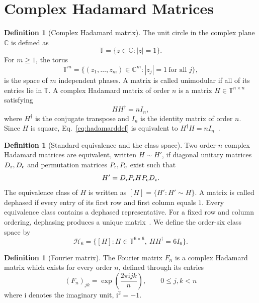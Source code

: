 \documentclass[aps,prx,reprint,nofootinbib,twoside,superscriptaddress,longbibliography,floatfix]{revtex4-2}
\theoremstyle{definition}
\newtheorem{definition}[theorem]{Definition}
\newcommand{\T}{\mathbb T}
\newcommand{\C}{\mathbb C}
\newcommand{\I}{\mathrm i}
\newcommand{\HH}{\mathcal H}
\begin{document}
\section{Complex Hadamard Matrices}
\label{sec:definition_hadamard}
\begin{definition}[Complex Hadamard matrix]
\label{def:hadamard}
The unit circle in the complex plane $\C$ is defined as
\begin{equation}
\T=\{z\in\C:|z|=1\}.
\label{eq:unitcircle}
\end{equation}
For $m\geq1$, the torus
\begin{equation}
    \T^m=\{(z_1,\ldots,z_m)\in\C^m:|z_j|=1\ \text{for all }j\},
\end{equation}
is the space of $m$ independent phases. 
A matrix is called unimodular if all of its entries lie in $\T$.
A complex Hadamard matrix of order $n$ is a matrix
$H\in\T^{n\times n}$ satisfying
\begin{equation}
HH^{\dagger}=nI_n,
\label{eq:hadamarddef}
\end{equation}
where $H^{\dagger}$ is the conjugate transpose and $I_n$ is the identity matrix of order $n$. Since $H$ is square, Eq.~\eqref{eq:hadamarddef} is equivalent to
$H^{\dagger}H=nI_n$~\cite{TadejZyczkowski2006}.
\end{definition}

\begin{definition}[Standard equivalence and the class space]
\label{def:equivalence}
Two order-$n$ complex Hadamard matrices are equivalent, written $H\sim H'$, if diagonal unitary matrices $D_{\rm r},D_{\rm c}$ and permutation matrices $P_{\rm r},P_{\rm c}$ exist such that
\begin{equation}
H'=D_{\rm r}P_{\rm r}HP_{\rm c}D_{\rm c}.
\label{eq:equivalence}
\end{equation}
The equivalence class of $H$ is written as $[H]=\{H':H'\sim H\}$. 
A matrix is called dephased if every entry of its first row and first column equals $1$. Every equivalence class contains a dephased representative. 
For a fixed row and column ordering, dephasing produces a unique matrix~\cite{TadejZyczkowski2006,Szollosi2012FourParameter}.
We define the order-six class space by
\begin{equation}
\HH_6 =\bigl\{[H]:H\in\T^{6\times6},\ HH^{\dagger}=6I_6\bigr\}.
\label{eq:H6classes}
\end{equation}
\end{definition}

\begin{definition}[Fourier matrix]
\label{def:fouriermatrix}
The Fourier matrix $F_n$ is a complex Hadamard matrix which exists for every order $n$, defined through its entries
\begin{equation}
(F_n)_{jk}=\exp\!\left(\frac{2\pi\I jk}{n}\right),
\qquad 0\leq j,k<n
\label{eq:fouriern}
\end{equation}
where $\I$ denotes the imaginary unit,
$\I^2=-1$. 
\end{definition}
\end{document}
